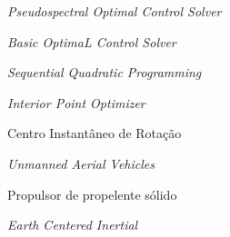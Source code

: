 \item[PSOPT] \textit{Pseudospectral Optimal Control Solver}
\item[COPILOTS] \textit{Basic OptimaL Control Solver}
\item[SQP] \textit{Sequential Quadratic Programming}
\item[IPOPT] \textit{Interior Point Optimizer}
\item[CIR] Centro Instantâneo de Rotação
\item[UAV] \textit{Unmanned Aerial Vehicles} 
\item[PPS] Propulsor de propelente sólido
\item[ECI] \textit{Earth Centered Inertial}
